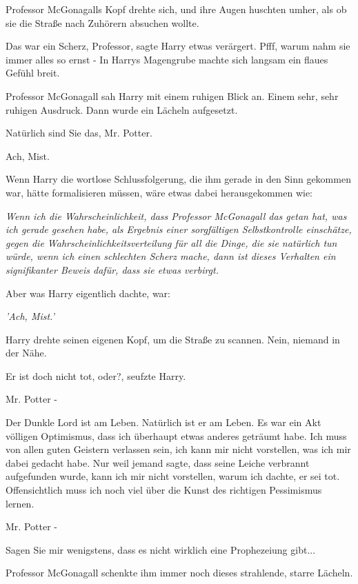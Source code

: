 Professor McGonagalls Kopf drehte sich, und ihre Augen huschten umher, als ob
sie die Straße nach Zuhörern absuchen wollte.

\glqq Das war ein Scherz, Professor\grqq{}, sagte Harry etwas verärgert. Pfff,
warum nahm sie immer alles so ernst - In Harrys Magengrube machte sich langsam
ein flaues Gefühl breit.

Professor McGonagall sah Harry mit einem ruhigen Blick an. Einem sehr, sehr
ruhigen Ausdruck. Dann wurde ein Lächeln aufgesetzt.

\glqq Natürlich sind Sie das, Mr. Potter.\grqq{}

Ach, Mist.

Wenn Harry die wortlose Schlussfolgerung, die ihm gerade in den Sinn gekommen
war, hätte formalisieren müssen, wäre etwas dabei herausgekommen wie:

\glqq{}\emph{Wenn ich die Wahrscheinlichkeit, dass Professor McGonagall das
getan hat, was ich gerade gesehen habe, als Ergebnis einer sorgfältigen
Selbstkontrolle einschätze, gegen die Wahrscheinlichkeitsverteilung für all die
Dinge, die sie natürlich tun würde, wenn ich einen schlechten Scherz mache, dann
ist dieses Verhalten ein signifikanter Beweis dafür, dass sie etwas
verbirgt.\grqq{} }

Aber was Harry eigentlich dachte, war:

\emph{'Ach, Mist.' }

Harry drehte seinen eigenen Kopf, um die Straße zu scannen. Nein, niemand in der
Nähe.

\glqq Er ist doch nicht tot, oder?\grqq{}, seufzte Harry.

\glqq Mr. Potter -\grqq{}

\glqq Der Dunkle Lord ist am Leben. Natürlich ist er am Leben. Es war ein Akt
völligen Optimismus, dass ich überhaupt etwas anderes geträumt habe. Ich muss
von allen guten Geistern verlassen sein, ich kann mir nicht vorstellen, was ich
mir dabei gedacht habe. Nur weil jemand sagte, dass seine Leiche verbrannt
aufgefunden wurde, kann ich mir nicht vorstellen, warum ich dachte, er sei tot.
Offensichtlich muss ich noch viel über die Kunst des richtigen Pessimismus
lernen.\grqq{}

\glqq Mr. Potter -\grqq{}

\glqq Sagen Sie mir wenigstens, dass es nicht wirklich eine Prophezeiung
gibt...\grqq{}

Professor McGonagall schenkte ihm immer noch dieses strahlende, starre Lächeln.


